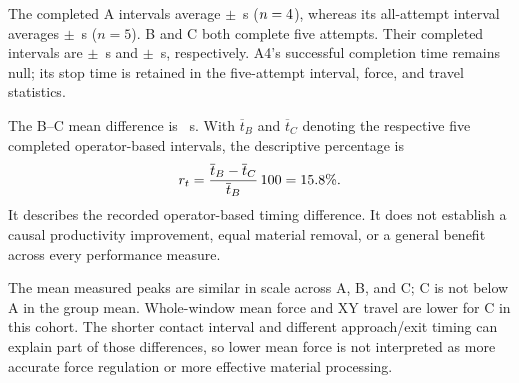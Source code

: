 \begin{table}[tbp]\centering\footnotesize
\caption[E2 corrected completion and interruption timing]{E2 timing with A4 corrected to interrupted. Completed-time statistics use A \(n=4\), B/C \(n=5\); all-attempt intervals use \(n=5\) in every condition. Values are mean \(\pm\) sample SD.}
\label{tab:e2_times}

\end{table}

The completed A intervals average \EtwoATime\(\pm\)\EtwoATimeSD~s (\(n=4\)), whereas its all-attempt interval averages \EtwoAInterval\(\pm\)\EtwoAIntervalSD~s (\(n=5\)). B and C both complete five attempts. Their completed intervals are \EtwoBTime\(\pm\)\EtwoBTimeSD~s and \EtwoCTime\(\pm\)\EtwoCTimeSD~s, respectively. A4's successful completion time remains null; its stop time is retained in the five-attempt interval, force, and travel statistics.

The B--C mean difference is \BCSeconds~s. With \(\overline t_B\) and \(\overline t_C\) denoting the respective five completed operator-based intervals, the descriptive percentage is
\begin{equation}
 r_t=\frac{\overline t_B-\overline t_C}{\overline t_B}\,100
     =15.8\%.
 \label{eq:bc_time_difference}
\end{equation}
It describes the recorded operator-based timing difference. It does not establish a causal productivity improvement, equal material removal, or a general benefit across every performance measure.


\begin{table}[tbp]\centering\footnotesize
\caption[E2 all-attempt force and travel]{E2 all-attempt force and motion statistics, \(n=5\) per condition. ``Peak'' is the mean of per-run measured peaks. Whole-window mean force includes approach and exit and is not a contact-only force-quality measure.}
\label{tab:e2_force_travel}

\end{table}

The mean measured peaks are similar in scale across A, B, and C; C is not below A in the group mean. Whole-window mean force and XY travel are lower for C in this cohort. The shorter contact interval and different approach/exit timing can explain part of those differences, so lower mean force is not interpreted as more accurate force regulation or more effective material processing.

